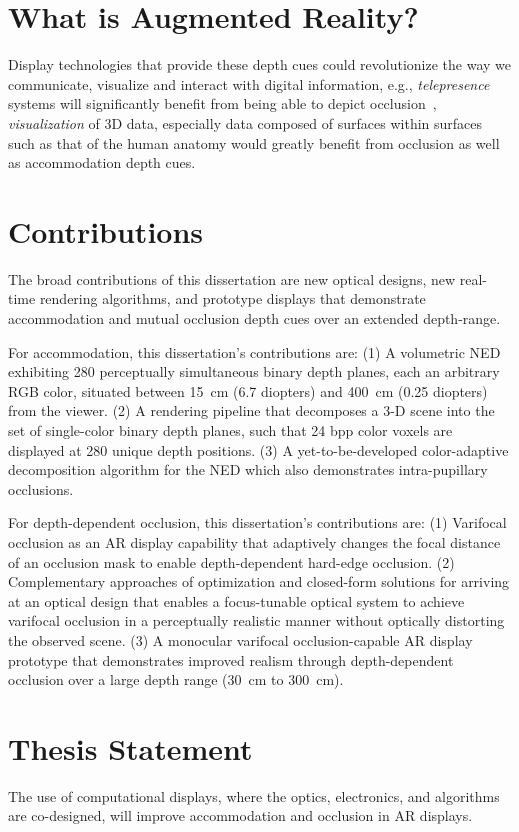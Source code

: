 \section{What is Augmented Reality?}


Display technologies that provide these depth cues could revolutionize the way we communicate, visualize and interact with digital information, e.g., \emph{telepresence} systems will significantly benefit from being able to depict occlusion~\cite{maimone2013general}, \emph{visualization} of 3D data, especially data composed of surfaces within surfaces such as that of the human anatomy would greatly benefit from occlusion as well as accommodation depth cues.

\section{Contributions}
The broad contributions of this dissertation are new optical designs, new real-time rendering algorithms, and prototype displays that demonstrate accommodation and mutual occlusion depth cues over an extended depth-range.

For accommodation, this dissertation's contributions are: (1) A volumetric NED exhibiting 280 perceptually simultaneous binary depth planes, each an arbitrary RGB color, situated between 15~cm (6.7 diopters) and 400~cm (0.25 diopters) from the viewer. (2) A rendering pipeline that decomposes a 3-D scene into the set of single-color binary depth planes, such that 24 bpp color voxels are displayed at 280 unique depth positions. (3) A yet-to-be-developed color-adaptive decomposition algorithm for the NED which also demonstrates intra-pupillary occlusions.

For depth-dependent occlusion, this dissertation's contributions are: (1) Varifocal occlusion as an AR display capability that adaptively changes the focal distance of an occlusion mask to enable depth-dependent hard-edge occlusion. (2) Complementary approaches of optimization and closed-form solutions for arriving at an optical design that enables a focus-tunable optical system to achieve varifocal occlusion in a perceptually realistic manner without optically distorting the observed scene. (3) A monocular varifocal occlusion-capable AR display prototype that demonstrates improved realism through depth-dependent occlusion over a large depth range (30~cm to 300~cm).


\section{Thesis Statement}
The use of computational displays, where the optics, electronics, and algorithms are co-designed, will improve accommodation and occlusion in AR displays. 

